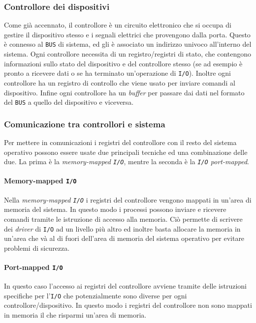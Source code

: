     \subsubsection{Controllore dei dispositivi}
        Come già accennato, il controllore è un circuito elettronico che si occupa di gestire il dispositivo stesso e i segnali elettrici che provengono dalla porta. Questo è connesso al \texttt{BUS} di sistema, ed gli è associato un indirizzo univoco all'interno del sistema. Ogni controllore necessita di un registro/registri di stato, che contengono informazioni sullo stato del dispositivo e del controllore stesso (se ad esempio è pronto a ricevere dati o se ha terminato un'operazione di \texttt{I/O}). Inoltre ogni controllore ha un registro di controllo che viene usato per inviare comandi al dispositivo. Infine ogni controllore ha un \textit{buffer} per passare dai dati nel formato del \texttt{BUS} a quello del dispositivo e viceversa.
    \subsubsection{Comunicazione tra controllori e sistema}
        Per mettere in comunicazioni i registri del controllore con il resto del sistema operativo possono essere usate due principali tecniche ed una combinazione delle due. La prima è la \textit{memory-mapped \texttt{I/O}}, mentre la seconda è la \textit{\texttt{I/O} port-mapped}. 
            \paragraph{Memory-mapped \texttt{I/O}} 
                Nella \textit{memory-mapped \texttt{I/O}} i registri del controllore vengono mappati in un'area di memoria del sistema. In questo modo i processi possono inviare e ricevere comandi tramite le istruzione di accesso alla memoria. Ciò permette di scrivere dei \textit{driver} di \texttt{I/O} ad un livello più altro ed inoltre basta allocare la memoria in un'area che và al di fuori dell'area di memoria del sistema operativo per evitare problemi di sicurezza. 
            \paragraph{Port-mapped \texttt{I/O}}
                In questo caso l'accesso ai registri del controllore avviene tramite delle istruzioni specifiche per l'\texttt{I/O} che potenzialmente sono diverse per ogni controllore/dispositivo. In questo modo i registri del controllore non sono mappati in memoria il che risparmi un'area di memoria.
